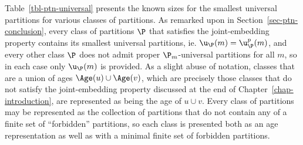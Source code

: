 Table~\ref{tbl-ptn-universal} presents the known sizes for the smallest universal partitions for various classes of partitions. As remarked upon in Section~\ref{sec-ptn-conclusion}, every class of partitions $\P$ that satisfies the joint-embedding property contains its smallest universal partitions, ie. $\u_{\P}(m) = \u_{\P}^p(m)$, and every other class $\P$ does not admit proper $\P_m$-universal partitions for all $m$, so in each case only $\u_{\P}(m)$ is provided. As a slight abuse of notation, classes that are a union of ages $\Age(u) \cup \Age(v)$, which are precisely those classes that do not satisfy the joint-embedding property discussed at the end of Chapter~\ref{chap-introduction}, are represented as being the age of $u \cup v$. Every class of partitions may be represented as the collection of partitions that do not contain any of a finite set of ``forbidden'' partitions, so each class is presented both as an age representation as well as with a minimal finite set of forbidden partitions.

